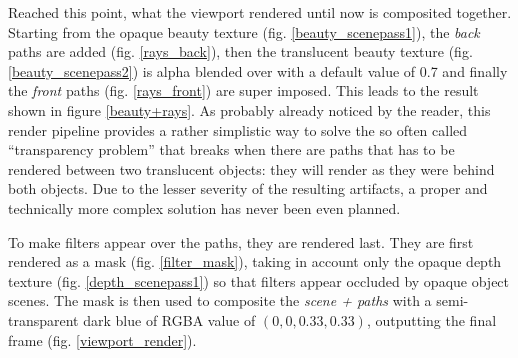Reached this point, what the viewport rendered until now is composited together.
Starting from the opaque beauty texture (fig. \ref{beauty_scenepass1}), the \textit{back} paths are added (fig. \ref{rays_back}), then the translucent beauty texture (fig. \ref{beauty_scenepass2}) is alpha blended over with a default value of 0.7 and finally the \textit{front} paths (fig. \ref{rays_front}) are super imposed. This leads to the result shown in figure \ref{beauty+rays}. As probably already noticed by the reader, this render pipeline provides a rather simplistic way to solve the so often called “transparency problem” that breaks when there are paths that has to be rendered between two translucent objects: they will render as they were behind both objects. Due to the lesser severity of the resulting artifacts, a proper and technically more complex solution has never been even planned.

To make filters appear over the paths, they are rendered last. They are first rendered as a mask (fig. \ref{filter_mask}), taking in account only the opaque depth texture (fig. \ref{depth_scenepass1}) so that filters appear occluded by opaque object scenes. The mask is then used to composite the \textit{scene + paths} with a semi-transparent dark blue of RGBA value of $(0,0,0.33,0.33)$, outputting the final frame (fig. \ref{viewport_render}).

